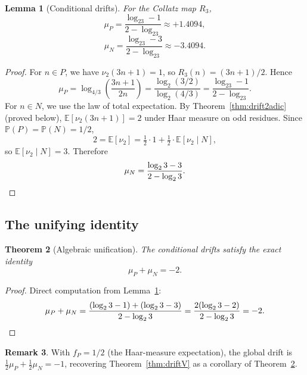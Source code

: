 \documentclass[12pt,reqno]{amsart}
\theoremstyle{plain}
\newtheorem{theorem}{Theorem}[section]
\newtheorem{lemma}[theorem]{Lemma}
\theoremstyle{definition}
\newtheorem{remark}[theorem]{Remark}
\newcommand{\E}{\mathbb{E}}
\newcommand{\PP}{\mathbb{P}}
\newcommand{\nuTwo}{\nu_2}
\newcommand{\logtwo}{\log_2}
\newcommand{\muP}{\mu_P}
\newcommand{\muN}{\mu_N}
\begin{document}
\begin{lemma}[Conditional drifts]\label{lem:conditional}
For the Collatz map $R_3$,
\begin{equation}\label{eq:muP}
\muP = \frac{\logtwo 3 - 1}{2 - \logtwo 3} \approx +1.4094,
\end{equation}
\begin{equation}\label{eq:muN}
\muN = \frac{\logtwo 3 - 3}{2 - \logtwo 3} \approx -3.4094.
\end{equation}
\end{lemma}

\begin{proof}
For $n \in P$, we have $\nuTwo(3n+1) = 1$, so $R_3(n) = (3n+1)/2$.
Hence
\[
\muP = \log_{4/3}\!\left(\frac{3n+1}{2n}\right)
     = \frac{\logtwo(3/2)}{\logtwo(4/3)}
     = \frac{\logtwo 3 - 1}{2 - \logtwo 3}.
\]
For $n \in N$, we use the law of total expectation.
By Theorem~\ref{thm:drift2adic} (proved below), $\E[\nuTwo(3n+1)] = 2$ under
Haar measure on odd residues. Since $\PP(P) = \PP(N) = 1/2$,
\[
2 = \E[\nuTwo] = \tfrac{1}{2} \cdot 1 + \tfrac{1}{2} \cdot \E[\nuTwo \mid N],
\]
so $\E[\nuTwo \mid N] = 3$. Therefore
\[
\muN = \frac{\logtwo 3 - 3}{2 - \logtwo 3}. \qedhere
\]
\end{proof}

\subsection{The unifying identity}

\begin{theorem}[Algebraic unification]\label{thm:identity}
The conditional drifts satisfy the exact identity
\begin{equation}\label{eq:identity}
\muP + \muN = -2.
\end{equation}
\end{theorem}

\begin{proof}
Direct computation from Lemma~\ref{lem:conditional}:
\[
\muP + \muN
= \frac{(\logtwo 3 - 1) + (\logtwo 3 - 3)}{2 - \logtwo 3}
= \frac{2(\logtwo 3 - 2)}{2 - \logtwo 3}
= -2. \qedhere
\]
\end{proof}

\begin{remark}
With $f_P = 1/2$ (the Haar-measure expectation), the global drift is
$\tfrac{1}{2}\muP + \tfrac{1}{2}\muN = -1$,
recovering Theorem~\ref{thm:driftV} as a corollary of Theorem~\ref{thm:identity}.
\end{remark}
\end{document}
